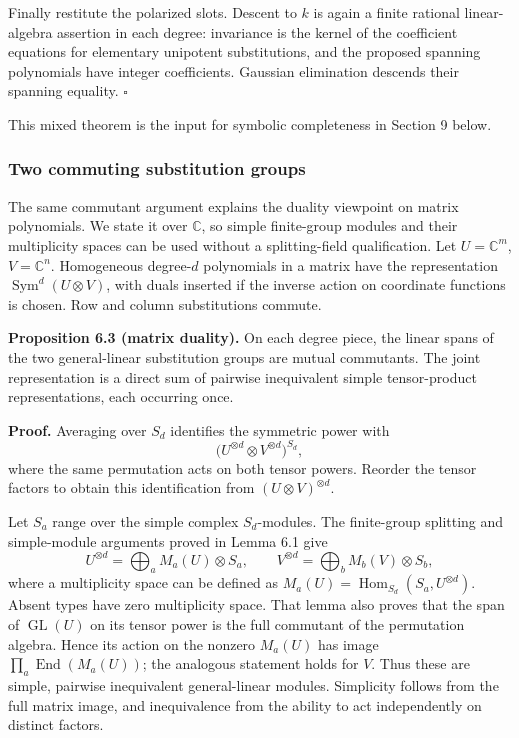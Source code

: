 \documentclass[
]{article}
\begin{document}
Finally restitute the polarized slots. Descent to \(k\) is again a
finite rational linear-algebra assertion in each degree: invariance is
the kernel of the coefficient equations for elementary unipotent
substitutions, and the proposed spanning polynomials have integer
coefficients. Gaussian elimination descends their spanning equality.
\(\square\)

This mixed theorem is the input for symbolic completeness in Section 9
below.

\subsubsection{Two commuting substitution
groups}\label{two-commuting-substitution-groups}

The same commutant argument explains the duality viewpoint on matrix
polynomials. We state it over \(\mathbb C\), so simple finite-group
modules and their multiplicity spaces can be used without a
splitting-field qualification. Let \(U=\mathbb C^m\), \(V=\mathbb C^n\).
Homogeneous degree-\(d\) polynomials in a matrix have the representation
\(\operatorname{Sym}^d(U\otimes V)\), with duals inserted if the inverse
action on coordinate functions is chosen. Row and column substitutions
commute.

\protect{}\label{proposition-6-3}{}

\textbf{Proposition 6.3 (matrix duality).} On each degree piece, the
linear spans of the two general-linear substitution groups are mutual
commutants. The joint representation is a direct sum of pairwise
inequivalent simple tensor-product representations, each occurring once.

\textbf{Proof.} Averaging over \(S_d\) identifies the symmetric power
with \[
\bigl(U^{\otimes d}\otimes V^{\otimes d}\bigr)^{S_d},
\] where the same permutation acts on both tensor powers. Reorder the
tensor factors to obtain this identification from
\((U\otimes V)^{\otimes d}\).

Let \(S_a\) range over the simple complex \(S_d\)-modules. The
finite-group splitting and simple-module arguments proved in Lemma 6.1
give \[
U^{\otimes d}=\bigoplus_a M_a(U)\otimes S_a,\qquad
V^{\otimes d}=\bigoplus_b M_b(V)\otimes S_b,
\] where a multiplicity space can be defined as
\(M_a(U)=\operatorname{Hom}_{S_d}(S_a,U^{\otimes d})\). Absent types
have zero multiplicity space. That lemma also proves that the span of
\(\operatorname{GL}(U)\) on its tensor power is the full commutant of
the permutation algebra. Hence its action on the nonzero \(M_a(U)\) has
image \(\prod_a\operatorname{End}(M_a(U))\); the analogous statement
holds for \(V\). Thus these are simple, pairwise inequivalent
general-linear modules. Simplicity follows from the full matrix image,
and inequivalence from the ability to act independently on distinct
factors.
\end{document}
